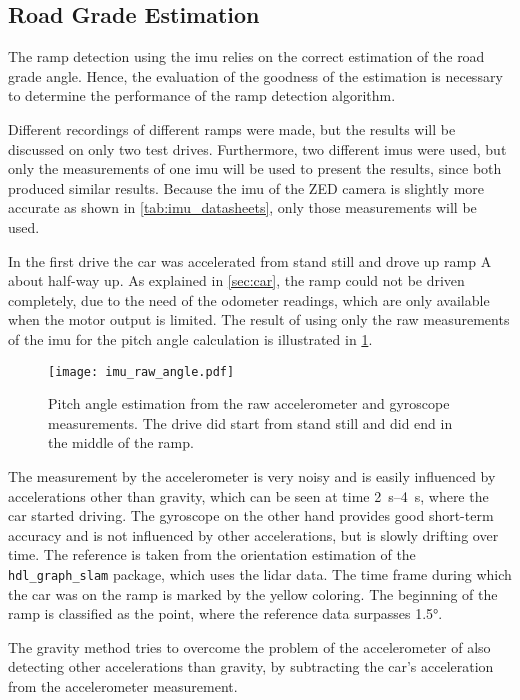 \subsection{Road Grade Estimation}
The ramp detection using the \gls{imu} relies on the correct estimation of the road grade angle.
Hence, the evaluation of the goodness of the estimation is necessary to determine the performance of the ramp detection algorithm.\par
Different recordings of different ramps were made, but the results will be discussed on only two test drives.
Furthermore, two different \glspl{imu} were used, but only the measurements of one \gls{imu} will be used to present the results, since both produced similar results.
Because the \gls{imu} of the ZED camera is slightly more accurate as shown in \cref{tab:imu_datasheets}, only those measurements will be used.\par
In the first drive the car was accelerated from stand still and drove up ramp A about half-way up.
As explained in \cref{sec:car}, the ramp could not be driven completely, due to the need of the odometer readings, which are only available when the motor output is limited.
The result of using only the raw measurements of the \gls{imu} for the pitch angle calculation is illustrated in \cref{fig:imu_raw_angle}.
\begin{figure}[htb]
	\centering
	\texttt{[image: imu\_raw\_angle.pdf]}
	\caption[Angle estimation using raw measurements]{Pitch angle estimation from the raw accelerometer and gyroscope measurements. The drive did start from stand still and did end in the middle of the ramp.}
	\label{fig:imu_raw_angle}
\end{figure}
The measurement by the accelerometer is very noisy and is easily influenced by accelerations other than gravity, which can be seen at time \SIrange{2}{4}{\second}, where the car started driving.
The gyroscope on the other hand provides good short-term accuracy and is not influenced by other accelerations, but is slowly drifting over time.
The reference is taken from the orientation estimation of the \texttt{hdl\_graph\_slam} package, which uses the \gls{lidar} data.
The time frame during which the car was on the ramp is marked by the yellow coloring.
The beginning of the ramp is classified as the point, where the reference data surpasses \ang{1.5}.\par
The gravity method tries to overcome the problem of the accelerometer of also detecting other accelerations than gravity, by subtracting the car's acceleration from the accelerometer measurement.
